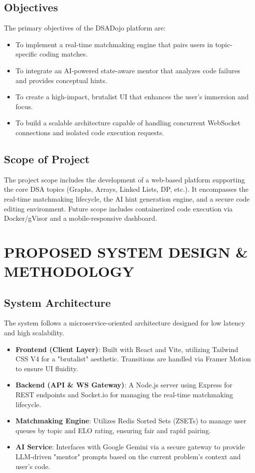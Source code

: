 \documentclass[12pt,a4paper]{report}
\begin{document}
\section{Objectives}
The primary objectives of the DSADojo platform are:
\begin{itemize}
    \item To implement a real-time matchmaking engine that pairs users in topic-specific coding matches.
    \item To integrate an AI-powered state-aware mentor that analyzes code failures and provides conceptual hints.
    \item To create a high-impact, brutalist UI that enhances the user's immersion and focus.
    \item To build a scalable architecture capable of handling concurrent WebSocket connections and isolated code execution requests.
\end{itemize}

\section{Scope of Project}
The project scope includes the development of a web-based platform supporting the core DSA topics (Graphs, Arrays, Linked Lists, DP, etc.). It encompasses the real-time matchmaking lifecycle, the AI hint generation engine, and a secure code editing environment. Future scope includes containerized code execution via Docker/gVisor and a mobile-responsive dashboard.

\chapter{PROPOSED SYSTEM DESIGN \& METHODOLOGY}
\section{System Architecture}
The system follows a microservice-oriented architecture designed for low latency and high scalability.
\begin{itemize}
    \item \textbf{Frontend (Client Layer)}: Built with React and Vite, utilizing Tailwind CSS V4 for a "brutalist" aesthetic. Transitions are handled via Framer Motion to ensure UI fluidity.
    \item \textbf{Backend (API \& WS Gateway)}: A Node.js server using Express for REST endpoints and Socket.io for managing the real-time matchmaking lifecycle.
    \item \textbf{Matchmaking Engine}: Utilizes Redis Sorted Sets (ZSETs) to manage user queues by topic and ELO rating, ensuring fair and rapid pairing.
    \item \textbf{AI Service}: Interfaces with Google Gemini via a secure gateway to provide LLM-driven "mentor" prompts based on the current problem's context and user's code.
\end{itemize}
\end{document}

